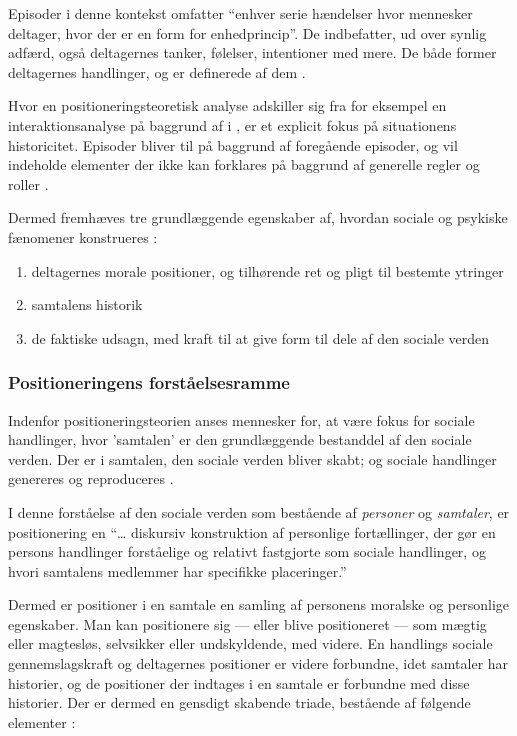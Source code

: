 Episoder i denne kontekst omfatter “enhver serie hændelser hvor 
mennesker deltager, hvor der er en form for enhedprincip”. De 
indbefatter, ud over synlig adfærd, også deltagernes tanker, 
følelser, intentioner med mere. De både former deltagernes 
handlinger, og er definerede af dem \autocite[s. 
5]{harrePositioningTheoryMoral1999}.

Hvor en positioneringsteoretisk analyse adskiller sig fra for 
eksempel en interaktionsanalyse på baggrund af 
\citeauthor{goffmanPresentationSelfEveryday1956} i
, er et explicit 
fokus på situationens historicitet. Episoder bliver til på 
baggrund af foregående episoder, og vil indeholde elementer der 
ikke kan forklares på baggrund af generelle regler og roller 
\autocite[s. 5-6]{harrePositioningTheoryMoral1999}.

Dermed fremhæves tre grundlæggende egenskaber af, hvordan sociale 
og psykiske fænomener konstrueres 
\autocite{harrePositioningTheoryMoral1999}:
\begin{enumerate}
  \item
    deltagernes morale positioner, og tilhørende ret og pligt 
    til bestemte ytringer
  \item
    samtalens historik
  \item
    de faktiske udsagn, med kraft til at give form til dele af 
    den sociale verden
\end{enumerate}

\subsubsection{Positioneringens forståelsesramme}

Indenfor positioneringsteorien anses mennesker for, at være fokus 
for sociale handlinger, hvor 'samtalen' er den grundlæggende 
bestanddel af den sociale verden. Der er i samtalen,
den sociale verden bliver skabt; og sociale handlinger genereres 
og reproduceres \autocite[s. 
15]{harrePositioningTheoryMoral1999}.

I denne forståelse af den sociale verden som bestående af 
\emph{personer} og \emph{samtaler}, er positionering en “\ldots 
diskursiv konstruktion af personlige fortællinger, der gør en 
persons handlinger forståelige og relativt fastgjorte som sociale 
handlinger, og hvori samtalens medlemmer har specifikke 
placeringer.” \autocite[s. 16]{harrePositioningTheoryMoral1999}

Dermed er positioner i en samtale en samling af personens moralske
og personlige egenskaber. Man kan positionere sig — eller blive 
positioneret — som mægtig eller magtesløs, selvsikker eller 
undskyldende, med videre. En handlings sociale gennemslagskraft og
deltagernes positioner er videre forbundne, idet samtaler har 
historier, og de positioner der indtages i en samtale er forbundne
med disse historier. Der er dermed en gensdigt skabende triade, 
bestående af følgende elementer \autocite[s.  
17-18]{harrePositioningTheoryMoral1999}:

